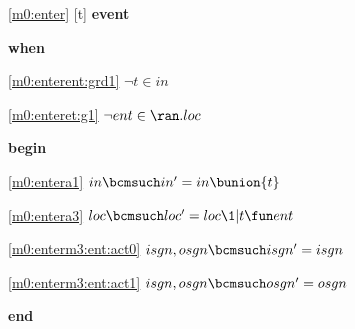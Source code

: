 \noindent \ref{m0:enter} [t] \textbf{event}
\begin{block}
  \item   \textbf{when}
  \begin{block}
  \item[ \eqref{m0:enterent:grd1} ]$\neg t \in in $ %
  \item[ \eqref{m0:enteret:g1} ]$\neg ent \in \ran.loc $ %
  \end{block}
  \item   \textbf{begin}
  \begin{block}
  \item[ \eqref{m0:entera1} ]$in \bcmsuch in' = in \bunion \{ t \} $ %
  \item[ \eqref{m0:entera3} ]$loc \bcmsuch loc' = loc \1| t \fun ent $ %
  \item[ \eqref{m0:enterm3:ent:act0} ]$isgn,osgn \bcmsuch isgn' = isgn$ %
  \item[ \eqref{m0:enterm3:ent:act1} ]$isgn,osgn \bcmsuch osgn' = osgn$ %
  \end{block}
  \item   \textbf{end} \\
\end{block}
